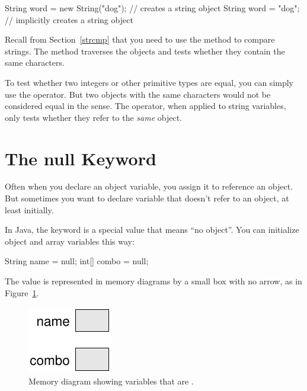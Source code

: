 \begin{code}
String word = new String("dog");  // creates a string object
String word = "dog";   // implicitly creates a string object
\end{code}


Recall from Section~\ref{strcmp} that you need to use the  method to compare strings.
The  method traverses the  objects and tests whether they contain the same characters.

To test whether two integers or other primitive types are equal, you can simply use the \java{==} operator.
But two  objects with the same characters would not be considered equal in the \java{==} sense.
The \java{==} operator, when applied to string variables, only tests whether they refer to the {\em same} object.


\section{The null Keyword}

Often when you declare an object variable, you assign it to reference an object.
But sometimes you want to declare variable that doesn't refer to an object, at least initially.


In Java, the keyword  is a special value that means ``no object''.
You can initialize object and array variables this way:

\begin{code}
String name = null;
int[] combo = null;
\end{code}

The value  is represented in memory diagrams by a small box with no arrow, as in Figure~\ref{fig.mem4}.

\begin{figure}[!ht]
\begin{center}
\includegraphics{figs/mem4.pdf}
\caption{Memory diagram showing variables that are .}
\label{fig.mem4}
\end{center}
\end{figure}

